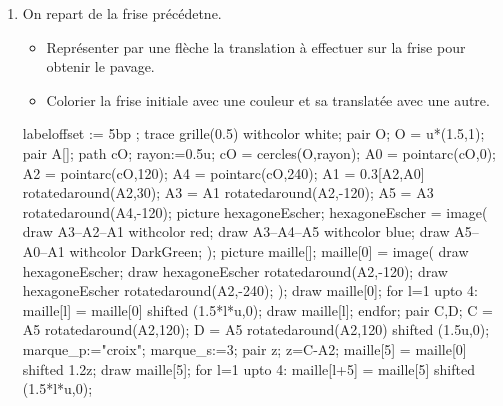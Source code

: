 \begin{exercice*}
\begin{changemargin}{-5mm}{0mm}
\begin{enumerate}
\begin{Geometrie}[CoinHD={(8u,3u)}]
            \end{Geometrie}
            \item On repart de la frise précédetne.
            \begin{itemize}
                \item Représenter par une flèche la translation à effectuer sur la frise pour obtenir le pavage.
                \item Colorier la frise initiale avec une couleur et sa translatée avec une autre.
            \end{itemize}
            \hspace*{-7mm}
            \begin{Geometrie}[CoinHD={(9u,4u)}]
                labeloffset := 5bp ;
                trace grille(0.5) withcolor white;
                pair O;
                O = u*(1.5,1);
                pair A[];
                path cO;
                rayon:=0.5u;
                cO = cercles(O,rayon);
                A0 = pointarc(cO,0);
                A2 = pointarc(cO,120);
                A4 = pointarc(cO,240);
                A1 = 0.3[A2,A0] rotatedaround(A2,30);
                A3 = A1 rotatedaround(A2,-120);
                A5 = A3 rotatedaround(A4,-120);        
                picture hexagoneEscher;
                hexagoneEscher = image(
                    draw A3--A2--A1 withcolor red;        
                        draw A3--A4--A5 withcolor blue;        
                        draw A5--A0--A1 withcolor DarkGreen;
                );
                picture maille[];
                maille[0] = image(
                    draw hexagoneEscher;
                    draw hexagoneEscher rotatedaround(A2,-120);
                    draw hexagoneEscher rotatedaround(A2,-240);
                );        
                draw maille[0];
                for l=1 upto 4:
                    maille[l] = maille[0] shifted (1.5*l*u,0);
                    draw maille[l];
                endfor;
                pair C,D;
                C = A5 rotatedaround(A2,120);
                D = A5 rotatedaround(A2,120) shifted (1.5u,0);
                marque_p:="croix";
                marque_s:=3;
                pair z;
                z=C-A2;
                maille[5] = maille[0] shifted 1.2z;
                draw maille[5];
                for l=1 upto 4:
                    maille[l+5] = maille[5] shifted (1.5*l*u,0);

\end{Geometrie}
\end{enumerate}
\end{changemargin}
\end{exercice*}
